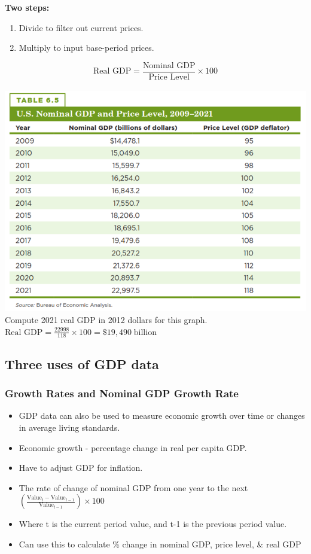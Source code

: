\documentclass[12pt]{article} %
\begin{document}
\textbf{Two steps:}\\

\begin{enumerate}
\item Divide to filter out current prices.
\item Multiply to input base-period prices.
\end{enumerate}

\begin{equation}
\text{Real GDP}=\frac{\text{Nominal GDP}}{\text{Price Level}}\times 100
\end{equation}\\
\includegraphics[scale=1]{../images/Picture11.png}\\
Compute 2021 real GDP in 2012 dollars for this graph.\\

\(\text{Real GDP}=\frac{22998}{118}\times 100=\$19,490 \;\text{billion}\)
\subsection{Three uses of GDP data}
\subsubsection{Growth Rates and Nominal GDP Growth Rate}
\begin{itemize}
\item GDP data can also be used to measure economic growth over time or changes in average living standards.
\item Economic growth - percentage change in real per capita GDP.
\item Have to adjust GDP for inflation.
\item The rate of change of nominal GDP from one year to the next \((\frac{\text{Value}_t-\text{Value}_{t-1}}{\text{Value}_{t-1}})\times 100\)
\item Where t is the current period value, and t-1 is the previous period value.
\item Can use this to calculate \% change in nominal GDP, price level, \& real GDP
\end{itemize}
\end{document}
